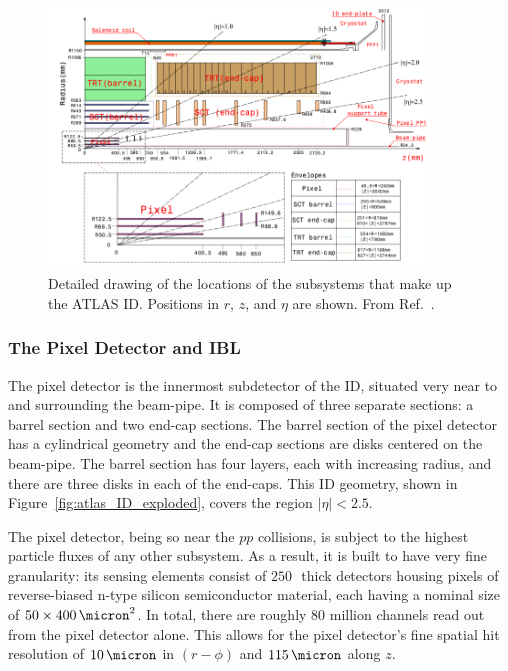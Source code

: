 \begin{figure}[!htb]
    \begin{center}
        \includegraphics[width=0.9\textwidth]{figures/chapter2/inner_detector/atlas_ID_plan_view}
        \caption{
            Detailed drawing of the locations of the subsystems that make up the ATLAS ID.
            Positions in $r$, $z$, and $\eta$ are shown.
            From Ref.~\cite{ATLASCollab}.
        }
        \label{fig:atlas_ID_plan_view}
    \end{center}
\end{figure}

\subsubsection{The Pixel Detector and IBL}
\label{sec:id_pixel}

The pixel detector is the innermost subdetector of the ID, situated very near to and surrounding
the beam-pipe.
It is composed of three separate sections: a barrel section and two end-cap sections.
The barrel section  of the pixel detector has a cylindrical geometry and the end-cap sections
are disks centered on the beam-pipe.
The barrel section has four layers, each with increasing radius, and there are three disks in each
of the end-caps. This ID geometry, shown in Figure~\ref{fig:atlas_ID_exploded}, covers
the region $\lvert \eta \rvert < 2.5$.

The pixel detector, being so near the $pp$ collisions, is subject to the highest particle
fluxes of any other subsystem.
As a result, it is built to have very fine granularity: its sensing elements consist of
$250$\,\micron~thick detectors housing pixels of reverse-biased n-type silicon semiconductor material,
each having a nominal size of $50\times400\,\micron^2$.
In total, there are roughly 80 million channels read out from the pixel detector alone.
This allows for the pixel detector's fine spatial hit resolution of $10\,\micron$ in
$(r-\phi)$ and $115\,\micron$ along $z$.

